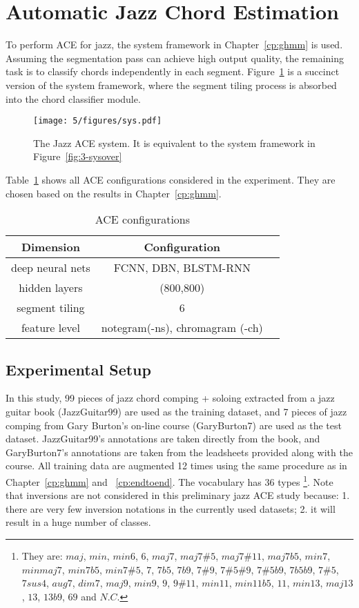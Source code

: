 \section{Automatic Jazz Chord Estimation} \label{sec:5-jazzace}
To perform ACE for jazz, the system framework in Chapter~\ref{cp:ghmm} is used. Assuming the segmentation pass can achieve high output quality, the remaining task is to classify chords independently in each segment. Figure~\ref{fig:5-jazzsys} is a succinct version of the system framework, where the segment tiling process is absorbed into the chord classifier module.
\begin{figure}[htb]
    \centering
        \texttt{[image: 5/figures/sys.pdf]}
    \caption{The Jazz ACE system. It is equivalent to the system framework in Figure~\ref{fig:3-sysover}}
    \label{fig:5-jazzsys}
\end{figure}

Table~\ref{tab:5-aceconfig} shows all ACE configurations considered in the experiment. They are chosen based on the results in Chapter~\ref{cp:ghmm}.
\begin{table}[htb]
\centering
\footnotesize
\begin{tabular}{|c|c|c|} \hline
Dimension & Configuration \\ \hline
deep neural nets & FCNN, DBN, BLSTM-RNN\\ \hline
hidden layers & (800,800)\\ \hline
segment tiling & 6\\ \hline
feature level & notegram(-ns), chromagram (-ch) \\ \hline
\end{tabular}
\caption{ACE configurations}
\label{tab:5-aceconfig}
\end{table}

\subsection{Experimental Setup}
In this study, 99 pieces of jazz chord comping + soloing extracted from a jazz guitar book \cite{jazzguitarbook} (JazzGuitar99) are used as the training dataset, and 7 pieces of jazz comping from Gary Burton's on-line course \cite{garyburtoncourse} (GaryBurton7) are used as the test dataset. JazzGuitar99's annotations are taken directly from the book, and GaryBurton7's annotations are taken from the leadsheets provided along with the course. All training data are augmented 12 times using the same procedure as in Chapter~\ref{cp:ghmm} and ~\ref{cp:endtoend}. The vocabulary has 36 types \footnote{They are: $maj$, $min$, $min6$, $6$, $maj7$, $maj7\#5$, $maj7\#11$, $maj7b5$, $min7$, $minmaj7$, $min7b5$, $min7\#5$, $7$, $7b5$, $7b9$, $7\#9$, $7\#5\#9$, $7\#5b9$, $7b5b9$, $7\#5$, $7sus4$, $aug7$, $dim7$, $ maj9$, $min9$, $9$, $9\#11$, $min11$, $min11b5$, $11$, $min13$, $maj13$, $13$, $13b9$, $69$ and $N.C.$}. Note that inversions are not considered in this preliminary jazz ACE study because: 1. there are very few inversion notations in the currently used datasets; 2. it will result in a huge number of classes.

